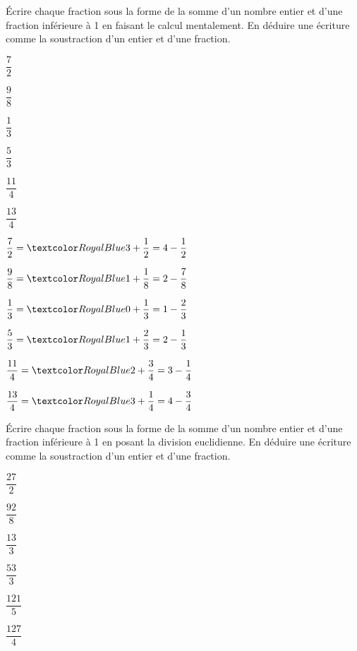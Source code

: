 \begin{Maquette}[Fiche,CorrigeFin,Colonnes=2]{}

   \begin{multicols}{2}

      \begin{exercice} %
         Écrire chaque fraction sous la forme de la somme d'un nombre entier et d'une fraction inférieure à 1 en faisant le calcul mentalement. En déduire une écriture comme la soustraction d'un entier et d'une fraction. \medskip
         \begin{colenumerate}[3]
            \item $\dfrac72$ \medskip
            \item $\dfrac98$
            \item $\dfrac13$
            \item $\dfrac53$
            \item $\dfrac{11}{4}$
            \item $\dfrac{13}{4}$
         \end{colenumerate}
      \end{exercice}
      
      \begin{Solution}
         \begin{colenumerate}
            \item $\dfrac72 =\cor{3+\dfrac12 =4-\dfrac12}$
            \item $\dfrac98 =\cor{1+\dfrac18 =2-\dfrac78}$
            \item $\dfrac13 =\cor{0+\dfrac13 =1-\dfrac23}$
            \item $\dfrac53 =\cor{1+\dfrac23 =2-\dfrac13}$
            \item $\dfrac{11}{4} =\cor{2+\dfrac34 =3-\dfrac14}$
            \item $\dfrac{13}{4} =\cor{3+\dfrac14 =4-\dfrac34}$
         \end{colenumerate}
      \end{Solution}
      
      
      \begin{exercice} %
         Écrire chaque fraction sous la forme de la somme d'un nombre entier et d'une fraction inférieure à 1 en posant la division euclidienne. En déduire une écriture comme la soustraction d'un entier et d'une fraction. \medskip
         \begin{colenumerate}[3]
            \item $\dfrac{27}2$ \medskip
            \item $\dfrac{92}8$
            \item $\dfrac{13}{3}$
            \item $\dfrac{53}{3}$
            \item $\dfrac{121}{5}$
            \item $\dfrac{127}{4}$
         \end{colenumerate}
      \end{exercice}
      

\end{multicols}
\end{Maquette}
